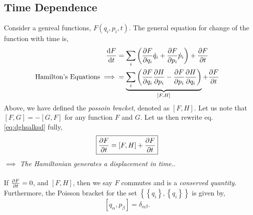 \documentclass{book}
\begin{document}
\subsection{Time Dependence}
Consider a genreal functions, $F(q_i,p_i,t)$. The general equation for change of the function with time is,
\begin{equation}
	\begin{split}
	\dv{F}{t} & = \sum_i\left(\pdv{F}{q_i}\Dot{q}_i + \pdv{F}{p_i}\Dot{p}_i\right) + \pdv{F}{t} \\
	\text{Hamilton's Equations} \implies & = \underbrace{\sum_i\left(\pdv{F}{q_i}\pdv{H}{p_i}-\pdv{F}{p_i}\pdv{H}{q_i}\right)}_{\left[F,H\right]} + \pdv{F}{t}
	\end{split} \label{eq:dghsalksd}
\end{equation}
Above, we have defined the \textit{possoin bracket}, denoted as $\left[F,H\right]$. Let us note that $\left[F,G\right] = - \left[G,F\right]$ for any function $F$ and $G$. Let us then rewrite eq. \eqref{eq:dghsalksd} fully,
\begin{equation}
	\boxed{\pdv{F}{t} = \left[F,H\right] + \pdv{F}{t}} \label{eq:important}
\end{equation}
$\implies$ \textit{The Hamiltonian generates a displacement in time.}.
\\\\
If $\pdv{F}{t} = 0$, and $\left[F, H\right]$, then we say $F$ commutes and is a \textit{conserved quantity}. Furthermore, the Poisson bracket for the set $\left\{\left\{q_i\right\},\left\{q_i\right\}\right\}$ is given by,
\begin{equation}
	\left[q_{\alpha},p_{\beta}\right] = \delta_{\alpha\beta}.
\end{equation}
\end{document}

